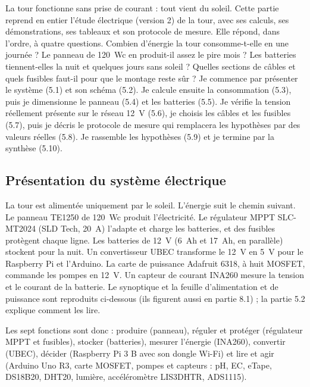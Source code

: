 \clearpage
{}

La tour fonctionne sans prise de courant : tout vient du soleil. Cette partie reprend en entier l'étude électrique (version 2) de la tour, avec ses calculs, ses démonstrations, ses tableaux et son protocole de mesure. Elle répond, dans l'ordre, à quatre questions. Combien d'énergie la tour consomme-t-elle en une journée ? Le panneau de \qty{120}{Wc} en produit-il assez le pire mois ? Les batteries tiennent-elles la nuit et quelques jours sans soleil ? Quelles sections de câbles et quels fusibles faut-il pour que le montage reste sûr ? Je commence par présenter le système (5.1) et son schéma (5.2). Je calcule ensuite la consommation (5.3), puis je dimensionne le panneau (5.4) et les batteries (5.5). Je vérifie la tension réellement présente sur le réseau \qty{12}{V} (5.6), je choisis les câbles et les fusibles (5.7), puis je décris le protocole de mesure qui remplacera les hypothèses par des valeurs réelles (5.8). Je rassemble les hypothèses (5.9) et je termine par la synthèse (5.10).

\subsection{Présentation du système électrique}

La tour est alimentée uniquement par le soleil. L'énergie suit le chemin suivant. Le panneau TE1250 de \qty{120}{Wc} produit l'électricité. Le régulateur MPPT SLC-MT2024 (SLD Tech, \qty{20}{A}) l'adapte et charge les batteries, et des fusibles protègent chaque ligne. Les batteries de \qty{12}{V} (\qty{6}{Ah} et \qty{17}{Ah}, en parallèle) stockent pour la nuit. Un convertisseur UBEC transforme le \qty{12}{V} en \qty{5}{V} pour le Raspberry Pi et l'Arduino. La carte de puissance Adafruit 6318, à huit MOSFET, commande les pompes en \qty{12}{V}. Un capteur de courant INA260 mesure la tension et le courant de la batterie. Le synoptique et la feuille d'alimentation et de puissance sont reproduits ci-dessous (ils figurent aussi en partie 8.1) ; la partie 5.2 explique comment les lire.

Les sept fonctions sont donc : produire (panneau), réguler et protéger (régulateur MPPT et fusibles), stocker (batteries), mesurer l'énergie (INA260), convertir (UBEC), décider (Raspberry Pi 3 B avec son dongle Wi-Fi) et lire et agir (Arduino Uno R3, carte MOSFET, pompes et capteurs : pH, EC, eTape, DS18B20, DHT20, lumière, accéléromètre LIS3DHTR, ADS1115).

